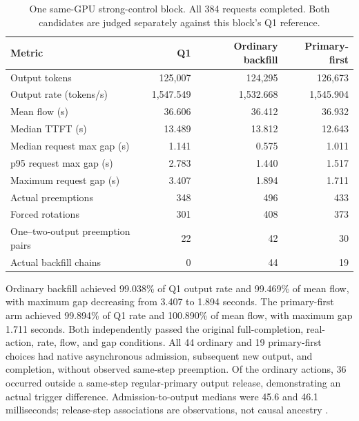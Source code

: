 \documentclass[10pt]{article}
\begin{document}
\begin{table}[t]
\centering\small
\caption{One same-GPU strong-control block. All 384 requests completed. Both candidates are judged separately against this block's Q1 reference.}
\label{tab:waitercontrol}
\begin{tabular}{lrrr}
\toprule
Metric & Q1 & Ordinary backfill & Primary-first \\
\midrule
Output tokens & 125,007 & 124,295 & 126,673 \\
Output rate (tokens/s) & 1,547.549 & 1,532.668 & 1,545.904 \\
Mean flow (s) & 36.606 & 36.412 & 36.932 \\
Median TTFT (s) & 13.489 & 13.812 & 12.643 \\
Median request max gap (s) & 1.141 & 0.575 & 1.011 \\
p95 request max gap (s) & 2.783 & 1.440 & 1.517 \\
Maximum request gap (s) & 3.407 & 1.894 & 1.711 \\
Actual preemptions & 348 & 496 & 433 \\
Forced rotations & 301 & 408 & 373 \\
One--two-output preemption pairs & 22 & 42 & 30 \\
Actual backfill chains & 0 & 44 & 19 \\
\bottomrule
\end{tabular}
\end{table}

Ordinary backfill achieved 99.038\% of Q1 output rate and 99.469\% of mean flow, with maximum gap decreasing from 3.407 to 1.894 seconds. The primary-first arm achieved 99.894\% of Q1 rate and 100.890\% of mean flow, with maximum gap 1.711 seconds. Both independently passed the original full-completion, real-action, rate, flow, and gap conditions. All 44 ordinary and 19 primary-first choices had native asynchronous admission, subsequent new output, and completion, without observed same-step preemption. Of the ordinary actions, 36 occurred outside a same-step regular-primary output release, demonstrating an actual trigger difference. Admission-to-output medians were 45.6 and 46.1 milliseconds; release-step associations are observations, not causal ancestry \cite{waitercontrol}.
\end{document}
